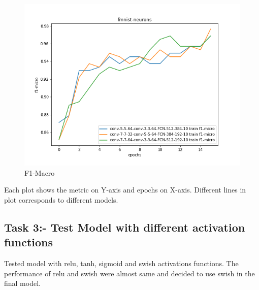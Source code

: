 \documentclass{article}
\begin{document}
\begin{figure}[!htb]
	\includegraphics[width=\linewidth]{../output_plots/FMNIST/task-2/fmnist-neurons-F1-micro-score-f1-micro.png}
	\caption{F1-Macro}\label{fig:part_1_task_2_f1-macro}
	\endminipage
\end{figure}

Each plot shows the metric on Y-axis and epochs on X-axis. Different lines in plot corresponds to different models.

\subsection{Task 3:- Test Model with different activation functions}

Tested model with relu, tanh, sigmoid and swish activations functions. The performance of relu and swish were almost same and decided to use swish in the final model.
\end{document}
